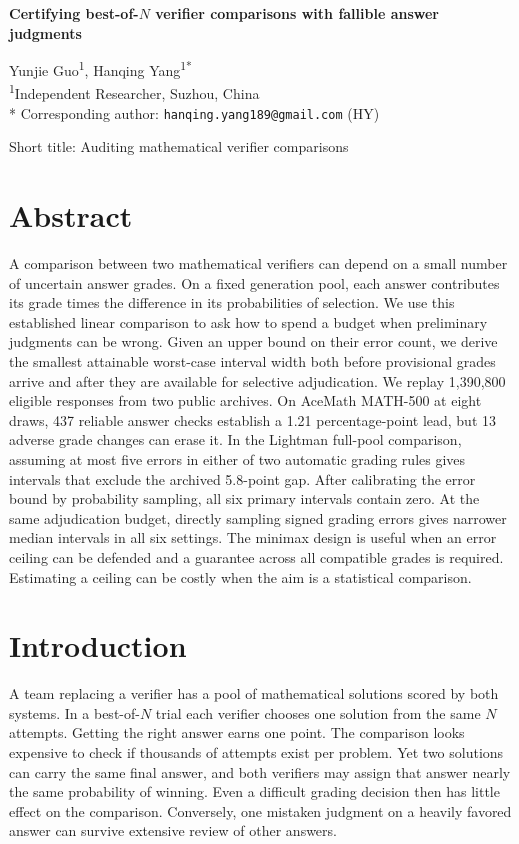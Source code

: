 \documentclass[10pt,letterpaper]{article}
\begin{document}
\begin{flushleft}
{\Large\bfseries Certifying best-of-$N$ verifier comparisons with fallible answer judgments\par}
\vspace{1em}
Yunjie Guo\textsuperscript{1}, Hanqing Yang\textsuperscript{1*}\\
\textsuperscript{1}Independent Researcher, Suzhou, China\\
* Corresponding author: \texttt{hanqing.yang189@gmail.com} (HY)
\end{flushleft}
\noindent Short title: Auditing mathematical verifier comparisons
\clearpage
{}
\fancyfootoffset[L]{0in}
\linenumbers
\section*{Abstract}
A comparison between two mathematical verifiers can depend on a small number of uncertain answer grades. On a fixed generation pool, each answer contributes its grade times the difference in its probabilities of selection. We use this established linear comparison to ask how to spend a budget when preliminary judgments can be wrong. Given an upper bound on their error count, we derive the smallest attainable worst-case interval width both before provisional grades arrive and after they are available for selective adjudication. We replay 1,390,800 eligible responses from two public archives. On AceMath MATH-500 at eight draws, 437 reliable answer checks establish a 1.21 percentage-point lead, but 13 adverse grade changes can erase it. In the Lightman full-pool comparison, assuming at most five errors in either of two automatic grading rules gives intervals that exclude the archived 5.8-point gap. After calibrating the error bound by probability sampling, all six primary intervals contain zero. At the same adjudication budget, directly sampling signed grading errors gives narrower median intervals in all six settings. The minimax design is useful when an error ceiling can be defended and a guarantee across all compatible grades is required. Estimating a ceiling can be costly when the aim is a statistical comparison.

\section*{Introduction}
A team replacing a verifier has a pool of mathematical solutions scored by both systems. In a best-of-$N$ trial each verifier chooses one solution from the same $N$ attempts. Getting the right answer earns one point. The comparison looks expensive to check if thousands of attempts exist per problem. Yet two solutions can carry the same final answer, and both verifiers may assign that answer nearly the same probability of winning. Even a difficult grading decision then has little effect on the comparison. Conversely, one mistaken judgment on a heavily favored answer can survive extensive review of other answers.
\end{document}
